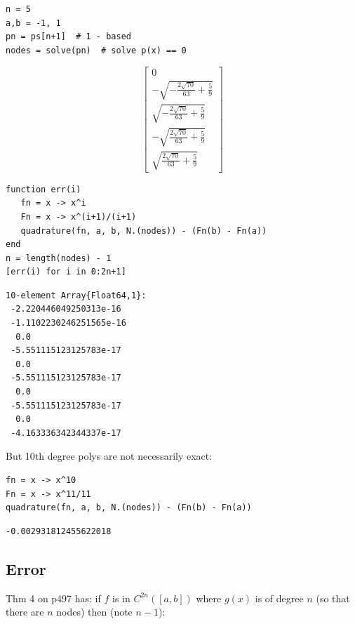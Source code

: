 \documentclass[12pt]{article}
\begin{document}
\begin{Verbatim}[framesep=1mm,frame=leftline,fontfamily=courier,formatcom=\color{darker-gray}]
n = 5
a,b = -1, 1
pn = ps[n+1]  # 1 - based
nodes = solve(pn)  # solve p(x) == 0
\end{Verbatim}
\[ \left[ \begin{array}{r}0\\- \sqrt{- \frac{2 \sqrt{70}}{63} + \frac{5}{9}}\\\sqrt{- \frac{2 \sqrt{70}}{63} + \frac{5}{9}}\\- \sqrt{\frac{2 \sqrt{70}}{63} + \frac{5}{9}}\\\sqrt{\frac{2 \sqrt{70}}{63} + \frac{5}{9}}\end{array} \right] \]\begin{Verbatim}[framesep=1mm,frame=leftline,fontfamily=courier,formatcom=\color{darker-gray}]
function err(i)
   fn = x -> x^i
   Fn = x -> x^(i+1)/(i+1)
   quadrature(fn, a, b, N.(nodes)) - (Fn(b) - Fn(a))
end
n = length(nodes) - 1
[err(i) for i in 0:2n+1]
\end{Verbatim}
\begin{Verbatim}[framesep=3mm,frame=leftline, fontshape=it,formatcom=\color{darker-gray}]
10-element Array{Float64,1}:
 -2.220446049250313e-16 
 -1.1102230246251565e-16
  0.0                   
 -5.551115123125783e-17 
  0.0                   
 -5.551115123125783e-17 
  0.0                   
 -5.551115123125783e-17 
  0.0                   
 -4.163336342344337e-17 
\end{Verbatim}
 

But 10th degree polys are not necessarily exact:

\begin{Verbatim}[framesep=1mm,frame=leftline,fontfamily=courier,formatcom=\color{darker-gray}]
fn = x -> x^10
Fn = x -> x^11/11
quadrature(fn, a, b, N.(nodes)) - (Fn(b) - Fn(a))
\end{Verbatim}
\begin{Verbatim}[framesep=3mm,frame=leftline, fontshape=it,formatcom=\color{darker-gray}]
-0.002931812455622018
\end{Verbatim}
 
\subsection{Error}


Thm 4 on p497 has: if $f$ is in $C^{2n}([a,b])$ where $g(x)$ is of degree $n$ (so that there are $n$ nodes) then (note $n-1$):
\end{document}
